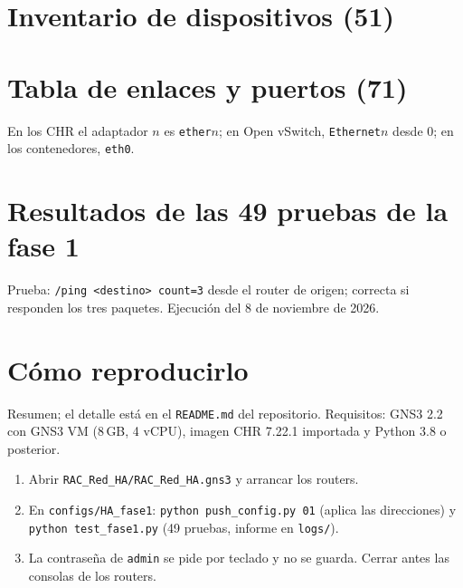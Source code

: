 \documentclass[11pt,a4paper]{article}
\newcommand{\cod}[1]{\texttt{#1}}
\begin{document}
\appendix
\section{Inventario de dispositivos (51)}


\section{Tabla de enlaces y puertos (71)}
En los CHR el adaptador $n$ es \cod{ether}$n$; en Open vSwitch, \cod{Ethernet}$n$ desde 0; en los contenedores, \cod{eth0}.


\section{Resultados de las 49 pruebas de la fase 1}\label{ap:pruebas}
Prueba: \cod{/ping <destino> count=3} desde el router de origen; correcta si responden los tres paquetes. Ejecución del 8 de noviembre de 2026.


\section{Cómo reproducirlo}
Resumen; el detalle está en el \cod{README.md} del repositorio. Requisitos: GNS3 2.2 con GNS3 VM (8\,GB, 4 vCPU), imagen CHR 7.22.1 importada y Python 3.8 o posterior.
\begin{enumerate}
\item Abrir \cod{RAC\_Red\_HA/RAC\_Red\_HA.gns3} y arrancar los routers.
\item En \cod{configs/HA\_fase1}: \cod{python push\_config.py 01} (aplica las direcciones) y \cod{python test\_fase1.py} (49 pruebas, informe en \cod{logs/}).
\item La contraseña de \cod{admin} se pide por teclado y no se guarda. Cerrar antes las consolas de los routers.
\end{enumerate}
\end{document}
